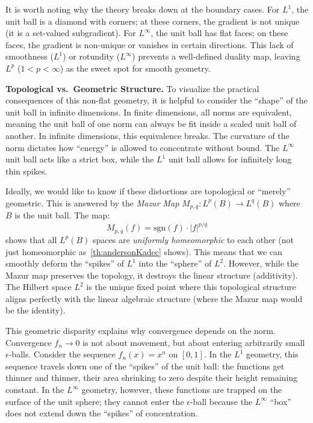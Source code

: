 \documentclass{article}
\begin{document}
It is worth noting why the theory breaks down at the boundary cases. For $L^1$, the unit ball is a diamond
with corners; at these corners, the gradient is not unique (it is a set-valued subgradient). For $L^\infty$,
the unit ball has flat faces; on these faces, the gradient is non-unique or vanishes in certain directions.
This lack of smoothness ($L^1$) or rotundity ($L^\infty$) prevents a well-defined duality map, leaving $L^p$
($1<p<\infty$) as the sweet spot for smooth geometry.

\medskip\noindent\textbf{Topological vs.\ Geometric Structure.}\quad
To visualize the practical consequences of this non-flat geometry, it is helpful to consider the ``shape'' of
the unit ball in infinite dimensions. In finite dimensions, all norms are equivalent, meaning the unit ball of
one norm can always be fit inside a scaled unit ball of another.
In infinite dimensions, this equivalence breaks. The curvature of the norm dictates how ``energy'' is allowed to
concentrate without bound. The $L^\infty$ unit ball acts like a strict box, while the $L^1$ unit ball allows for infinitely long thin spikes.

Ideally, we would like to know if these distortions are topological or ``merely'' geometric. This is answered by the \emph{Mazur Map} $M_{p,q}: L^p(B) \to L^q(B)$ where $B$ is the unit ball. The map:
\[
M_{p,q}(f) = \text{sgn}(f) \cdot |f|^{p/q}
\]
shows that all $L^p(B)$ spaces are \emph{uniformly homeomorphic} to each other (not just homeomorphic
as~\cref{th:andersonKadec} shows). This means that we can smoothly deform the ``spikes'' of $L^1$ into the
``sphere'' of $L^2$. However, while the Mazur map preserves the topology, it destroys the linear structure
(additivity). The Hilbert space $L^2$ is the unique fixed point where this topological structure aligns
perfectly with the linear algebraic structure (where the Mazur map would be the identity).

This geometric disparity explains why convergence depends on the norm. Convergence $f_n \to 0$ is not about
movement, but about entering arbitrarily small $\epsilon$-balls. Consider the sequence $f_n(x) = x^n$ on
$[0,1]$. In the $L^1$ geometry, this sequence travels down one of the ``spikes'' of the unit ball: the functions get
thinner and thinner, their area shrinking to zero despite their height
remaining constant. In the $L^\infty$ geometry, however, these functions are trapped on the surface of the unit
sphere; they cannot enter the $\epsilon$-ball because the $L^\infty$ ``box'' does not extend down
the ``spikes'' of concentration.
\end{document}
